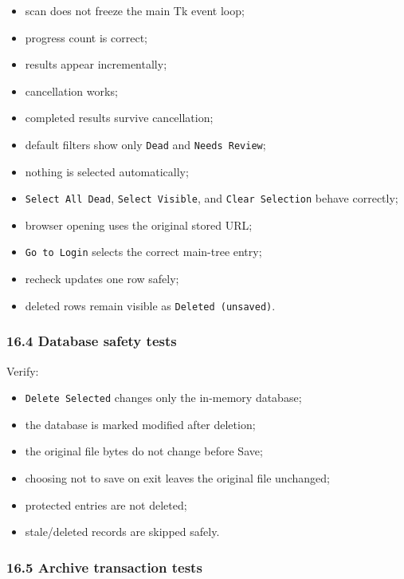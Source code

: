 \documentclass[
  letterpaper,
]{article}
\newcommand{\passthrough}[1]{#1}
\providecommand{\tightlist}{%
  \setlength{\itemsep}{0pt}\setlength{\parskip}{0pt}}
\begin{document}
\begin{itemize}
\tightlist
\item
  scan does not freeze the main Tk event loop;
\item
  progress count is correct;
\item
  results appear incrementally;
\item
  cancellation works;
\item
  completed results survive cancellation;
\item
  default filters show only \passthrough{\lstinline!Dead!} and \passthrough{\lstinline!Needs Review!};
\item
  nothing is selected automatically;
\item
  \passthrough{\lstinline!Select All Dead!}, \passthrough{\lstinline!Select Visible!}, and
  \passthrough{\lstinline!Clear Selection!} behave correctly;
\item
  browser opening uses the original stored URL;
\item
  \passthrough{\lstinline!Go to Login!} selects the correct main-tree entry;
\item
  recheck updates one row safely;
\item
  deleted rows remain visible as \passthrough{\lstinline!Deleted (unsaved)!}.
\end{itemize}

\subsubsection{16.4 Database safety tests}\label{164-database-safety-tests}

Verify:

\begin{itemize}
\tightlist
\item
  \passthrough{\lstinline!Delete Selected!} changes only the in-memory database;
\item
  the database is marked modified after deletion;
\item
  the original file bytes do not change before Save;
\item
  choosing not to save on exit leaves the original file unchanged;
\item
  protected entries are not deleted;
\item
  stale/deleted records are skipped safely.
\end{itemize}

\subsubsection{16.5 Archive transaction tests}\label{165-archive-transaction-tests}
\end{document}
